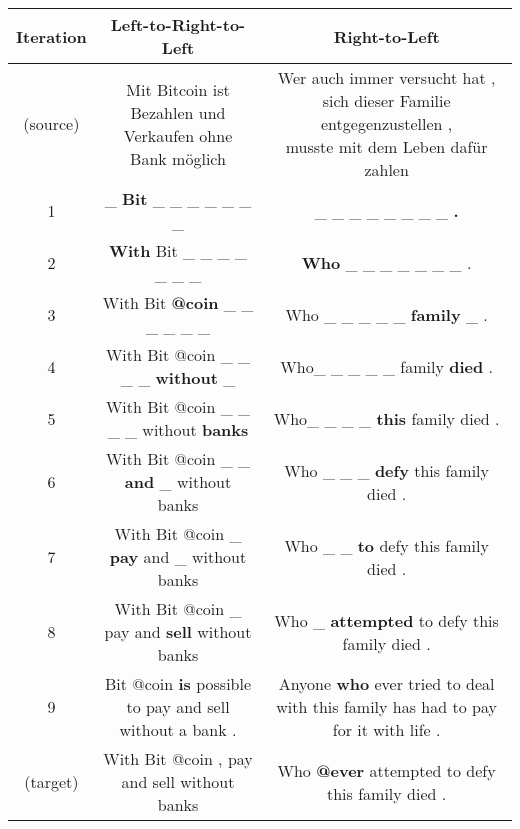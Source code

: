 \centering
\footnotesize
\begin{tabular}{ccc}
\toprule
Iteration & {\color{orange} Left-to-Right-to-Left} & {\color{blue} Right-to-Left} \\
\midrule
(source) & \makecell{Mit Bitcoin ist Bezahlen und \\ Verkaufen ohne Bank möglich} & \makecell{Wer auch immer versucht hat , \\ sich dieser Familie entgegenzustellen , \\ musste mit dem Leben dafür zahlen} \\
1 & \_ \textbf{Bit} \_ \_ \_ \_ \_ \_ \_ & \_ \_ \_ \_ \_ \_ \_ \_ \textbf{.} \\
2 & \textbf{With} Bit \_ \_ \_ \_ \_ \_ \_ & \textbf{Who} \_ \_ \_ \_ \_ \_ \_ . \\
3 & With Bit \textbf{@coin} \_ \_ \_ \_ \_ \_ & Who \_ \_ \_ \_ \_ \textbf{family} \_ . \\
4 & With Bit @coin \_ \_ \_ \_ \textbf{without} \_ & Who\_ \_ \_ \_ \_ family \textbf{died} . \\
5 & With Bit @coin \_ \_ \_ \_ without \textbf{banks} & Who\_ \_ \_ \_ \textbf{this} family died . \\
6 & With Bit @coin \_ \_ \textbf{and} \_ without banks & Who \_ \_ \_ \textbf{defy} this family died . \\
7 & With Bit @coin \_ \textbf{pay} and \_ without banks & Who \_ \_ \textbf{to} defy this family died . \\
8 & With Bit @coin \_ pay and \textbf{sell} without banks & Who \_ \textbf{attempted} to defy this family died . \\
9 & Bit @coin \textbf{is} possible to pay and sell without a bank . & Anyone \textbf{who} ever tried to deal with this family has had to pay for it with life . \\
(target) & With Bit @coin , pay and sell without banks & Who \textbf{@ever} attempted to defy this family died . \\


\end{tabular}
